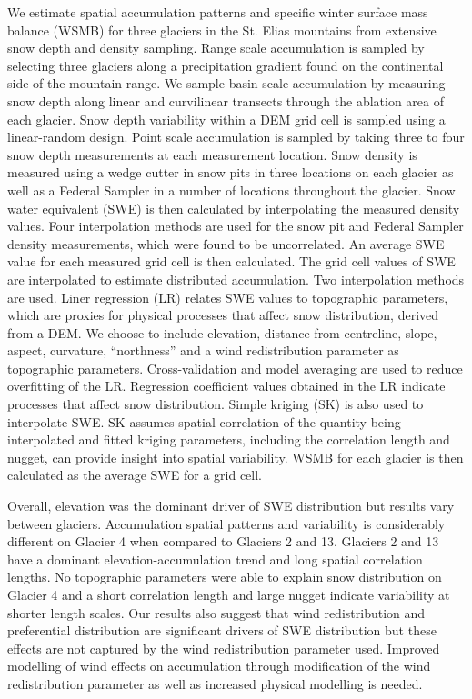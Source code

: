 \documentclass[twocolumn,letterpaper]{igs}
\begin{document}
We estimate spatial accumulation patterns and specific winter surface mass balance (WSMB) for three glaciers in the St. Elias mountains from extensive snow depth and density sampling. Range scale accumulation is sampled by selecting three glaciers along a precipitation gradient found on the continental side of the mountain range. We sample basin scale accumulation by measuring snow depth along linear and curvilinear transects through the ablation area of each glacier. Snow depth variability within a DEM grid cell is sampled using a linear-random design. Point scale accumulation is sampled by taking three to four snow depth measurements at each measurement location. Snow density is measured using a wedge cutter in snow pits in three locations on each glacier as well as a Federal Sampler in a number of locations throughout the glacier. Snow water equivalent (SWE) is then calculated by interpolating the measured density values. Four interpolation methods are used for the snow pit and Federal Sampler density measurements, which were found to be uncorrelated. An average SWE value for each measured grid cell is then calculated. The grid cell values of SWE are interpolated to estimate distributed accumulation. Two interpolation methods are used. Liner regression (LR) relates SWE values to topographic parameters, which are proxies for physical processes that affect snow distribution, derived from a DEM. We choose to include elevation, distance from centreline, slope, aspect, curvature, ``northness'' and a wind redistribution parameter as topographic parameters. Cross-validation and model averaging are used to reduce overfitting of the LR. Regression coefficient values obtained in the LR indicate processes that affect snow distribution. Simple kriging (SK) is also used to interpolate SWE. SK assumes spatial correlation of the quantity being interpolated and fitted kriging parameters, including the correlation length and nugget, can provide insight into spatial variability. WSMB for each glacier is then calculated as the average SWE for a grid cell.

Overall, elevation was the dominant driver of SWE distribution but results vary between glaciers. Accumulation spatial patterns and variability is considerably different on Glacier 4 when compared to Glaciers 2 and 13. Glaciers 2 and 13 have a dominant elevation-accumulation trend and long spatial correlation lengths. No topographic parameters were able to explain snow distribution on Glacier 4 and a short correlation length and large nugget indicate variability at shorter length scales. Our results also suggest that wind redistribution and preferential distribution are significant drivers of SWE distribution but these effects are not captured by the wind redistribution parameter used. Improved modelling of wind effects on accumulation through modification of the wind redistribution parameter as well as increased physical modelling is needed.
\end{document}

